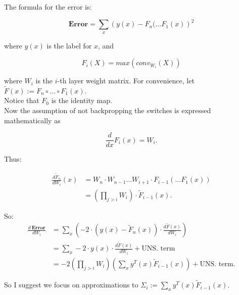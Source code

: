 \documentclass[11pt]{article}
\title{}
\author{}
\date{}
\begin{document}

\maketitle

\thispagestyle{empty}

The formula for the error is:

$$\textbf{Error} = \sum_{x} \left (y(x) - F_n( \ldots F_1(x) \right)^2$$

where $y(x)$ is the label for $x$, and 

$$F_i(X) = max(conv_{W_i}(X))$$

where $W_i$ is the $i$-th layer weight matrix.   For convenience, let $\tilde{F}(x) := F_n \circ \ldots \circ F_1 (x)$. \\

Notice that $F_0$ is the identity map. \\

Now the assumption of not backpropping the switches is expressed mathematically as

$$\frac{d}{dx}F_i(x) = W_i.$$

Thus:

\begin{eqnarray*}
\frac{d \tilde{F}_n}{d W_i}(x) & = W_n \cdot W_{n-1} \ldots W_{i+1} \cdot F_{i-1}( \ldots F_1(x)) \\
                            & = \left( \prod_{j > i} W_i \right) \cdot \tilde{F}_{i-1}(x).
\end{eqnarray*}                 
                 
So:                        
\begin{eqnarray*}
\frac{d\ \mathbf{Error}}{d W_i} & = \sum_x \left ( -2 \cdot (y(x) - \tilde{F}_n(x)) \cdot \frac{d\tilde{F}(x)}{dW_i} \right ) \\     
                      & = \sum_x -2 \cdot y(x) \cdot  \frac{d\tilde{F}(x)}{dW_i} + \text{UNS. term} \\
                      & = -2 \left(\prod_{j > i} W_i \right) \left(\sum_x y^T(x) \tilde{F}_{i-1}(x) \right) + \text{UNS. term}.
\end{eqnarray*}

So I suggest we focus on approximations to $\Sigma_{i} := \sum_x y^T(x) \tilde{F}_{i-1}(x)$.

\newpage

\footnotesize{

\linespread{0.9}

}
\end{document}
